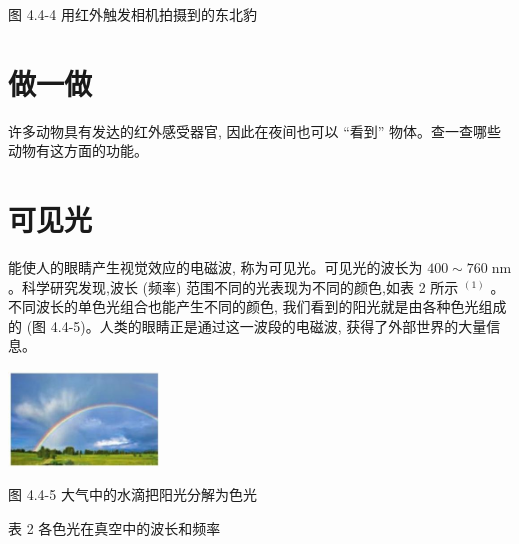 \documentclass[10pt]{article}
\begin{document}
图 4.4-4 用红外触发相机拍摄到的东北豹

\section*{做一做}

许多动物具有发达的红外感受器官, 因此在夜间也可以 “看到” 物体。查一查哪些动物有这方面的功能。

\section*{可见光}

能使人的眼睛产生视觉效应的电磁波, 称为可见光。可见光的波长为 \({400} \sim {760}\mathrm{\;{nm}}\) 。科学研究发现,波长 (频率) 范围不同的光表现为不同的颜色,如表 2 所示 \({}^{\left( 1\right) }\) 。不同波长的单色光组合也能产生不同的颜色, 我们看到的阳光就是由各种色光组成的 (图 4.4-5)。人类的眼睛正是通过这一波段的电磁波, 获得了外部世界的大量信息。

\begin{center}
\includegraphics[max width=0.3\textwidth]{images/01910e72-c5b7-7ed5-a6d4-fb3a5faefc32_90_779576.jpg}
\end{center}

图 4.4-5 大气中的水滴把阳光分解为色光

表 2 各色光在真空中的波长和频率

\begin{center}
\end{center}
\end{document}
